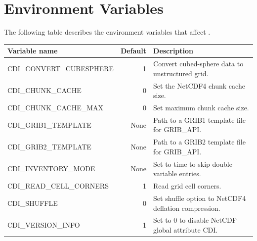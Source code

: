 \chapter{\label{environment}Environment Variables}

The following table describes the environment variables that affect {\CDI}.


\begin{tabular}[t]{|>{\columncolor{pcolor1}}l|r|l|}
\hline
\rowcolor{pcolor2}
{\bfseries Variable name}           &  {\bfseries Default} & {\bfseries Description} \\ \hline
CDI\_CONVERT\_CUBESPHERE &        1   & Convert cubed-sphere data to unstructured grid. \\
CDI\_CHUNK\_CACHE            &         0   & Set the NetCDF4 chunk cache size. \\
CDI\_CHUNK\_CACHE\_MAX  &         0   & Set maximum chunk cache size. \\
CDI\_GRIB1\_TEMPLATE          &   None   &  Path to a GRIB1 template file for GRIB\_API. \\
CDI\_GRIB2\_TEMPLATE          &   None   &  Path to a GRIB2 template file for GRIB\_API. \\
CDI\_INVENTORY\_MODE        &   None   &  Set to time to skip double variable entries. \\
CDI\_READ\_CELL\_CORNERS  &         1   &  Read grid cell corners. \\
CDI\_SHUFFLE                            &         0   & Set shuffle option to NetCDF4 deflation compression. \\
CDI\_VERSION\_INFO               &         1   &  Set to 0 to disable NetCDF global attribute CDI.
\end{tabular}
